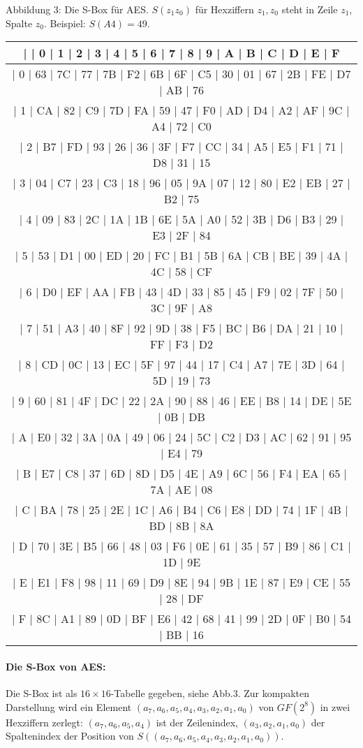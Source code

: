 \documentclass[a4paper]{article}
\begin{document}
\begin{multicols}{3}
    Abbildung 3: Die S-Box für AES. $S(z_1 z_0)$ für Hexziffern $z_1,z_0$ steht in Zeile $z_1$, Spalte $z_0$. Beispiel: $S(A4)=49$.
    \begin{tabular}{c}
    |   | 0  | 1  | 2  | 3  | 4  | 5  | 6  | 7  | 8  | 9  | A  | B  | C  | D  | E  | F  \\\hline
    | 0  | 63 | 7C | 77 | 7B | F2 | 6B | 6F | C5 | 30 | 01 | 67 | 2B | FE | D7 | AB | 76 \\
    | 1  | CA | 82 | C9 | 7D | FA | 59 | 47 | F0 | AD | D4 | A2 | AF | 9C | A4 | 72 | C0 \\
    | 2  | B7 | FD | 93 | 26 | 36 | 3F | F7 | CC | 34 | A5 | E5 | F1 | 71 | D8 | 31 | 15 \\
    | 3  | 04 | C7 | 23 | C3 | 18 | 96 | 05 | 9A | 07 | 12 | 80 | E2 | EB | 27 | B2 | 75 \\
    | 4  | 09 | 83 | 2C | 1A | 1B | 6E | 5A | A0 | 52 | 3B | D6 | B3 | 29 | E3 | 2F | 84 \\
    | 5  | 53 | D1 | 00 | ED | 20 | FC | B1 | 5B | 6A | CB | BE | 39 | 4A | 4C | 58 | CF \\
    | 6  | D0 | EF | AA | FB | 43 | 4D | 33 | 85 | 45 | F9 | 02 | 7F | 50 | 3C | 9F | A8 \\
    | 7  | 51 | A3 | 40 | 8F | 92 | 9D | 38 | F5 | BC | B6 | DA | 21 | 10 | FF | F3 | D2 \\
    | 8  | CD | 0C | 13 | EC | 5F | 97 | 44 | 17 | C4 | A7 | 7E | 3D | 64 | 5D | 19 | 73 \\
    | 9  | 60 | 81 | 4F | DC | 22 | 2A | 90 | 88 | 46 | EE | B8 | 14 | DE | 5E | 0B | DB \\
    | A  | E0 | 32 | 3A | 0A | 49 | 06 | 24 | 5C | C2 | D3 | AC | 62 | 91 | 95 | E4 | 79 \\
    | B  | E7 | C8 | 37 | 6D | 8D | D5 | 4E | A9 | 6C | 56 | F4 | EA | 65 | 7A | AE | 08 \\
    | C  | BA | 78 | 25 | 2E | 1C | A6 | B4 | C6 | E8 | DD | 74 | 1F | 4B | BD | 8B | 8A \\
    | D  | 70 | 3E | B5 | 66 | 48 | 03 | F6 | 0E | 61 | 35 | 57 | B9 | 86 | C1 | 1D | 9E \\
    | E  | E1 | F8 | 98 | 11 | 69 | D9 | 8E | 94 | 9B | 1E | 87 | E9 | CE | 55 | 28 | DF \\
    | F  | 8C | A1 | 89 | 0D | BF | E6 | 42 | 68 | 41 | 99 | 2D | 0F | B0 | 54 | BB | 16 
    \end{tabular}

    \paragraph{Die S-Box von AES:}
    Die S-Box ist als $16\times 16$-Tabelle gegeben, siehe Abb.3. Zur kompakten Darstellung wird ein Element $(a_7,a_6,a_5,a_4,a_3,a_2,a_1,a_0)$ von $GF(2^8)$ in zwei Hexziffern zerlegt: $(a_7,a_6,a_5,a_4)$ ist der Zeilenindex, $(a_3,a_2,a_1,a_0)$ der Spaltenindex der Position von $S((a_7,a_6,a_5,a_4,a_3,a_2,a_1,a_0))$.


\end{multicols}
\end{document}
